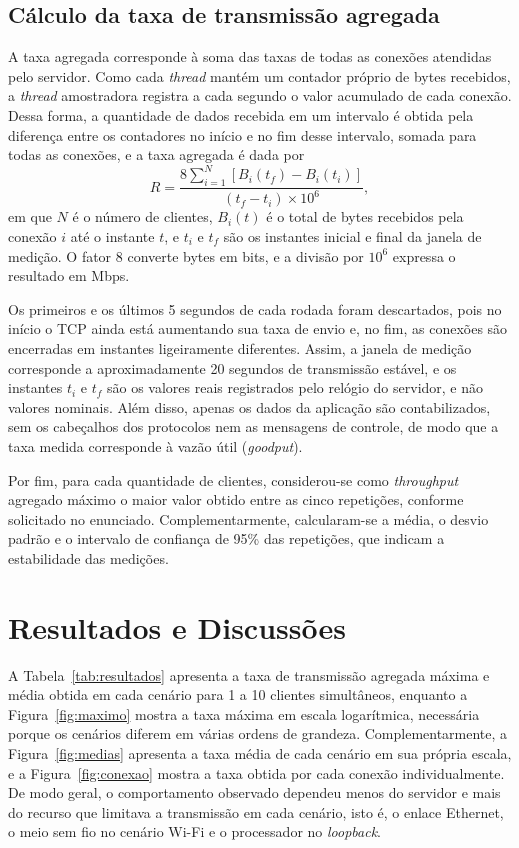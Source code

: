 \documentclass[12pt]{article}
\begin{document}
\subsection{Cálculo da taxa de transmissão agregada}

A taxa agregada corresponde à soma das taxas de todas as conexões atendidas
pelo servidor. Como cada \textit{thread} mantém um contador próprio de bytes
recebidos, a \textit{thread} amostradora registra a cada segundo o valor
acumulado de cada conexão. Dessa forma, a quantidade de dados recebida em um
intervalo é obtida pela diferença entre os contadores no início e no fim desse
intervalo, somada para todas as conexões, e a taxa agregada é dada por
\begin{equation}
R = \frac{8 \sum_{i=1}^{N} \left[ B_i(t_f) - B_i(t_i) \right]}{(t_f - t_i) \times 10^6},
\end{equation}
em que $N$ é o número de clientes, $B_i(t)$ é o total de bytes recebidos pela
conexão $i$ até o instante $t$, e $t_i$ e $t_f$ são os instantes inicial e
final da janela de medição. O fator 8 converte bytes em bits, e a divisão por
$10^6$ expressa o resultado em Mbps.

Os primeiros e os últimos 5 segundos de cada rodada foram descartados, pois no
início o TCP ainda está aumentando sua taxa de envio e, no fim, as conexões são
encerradas em instantes ligeiramente diferentes. Assim, a janela de medição
corresponde a aproximadamente 20 segundos de transmissão estável, e os
instantes $t_i$ e $t_f$ são os valores reais registrados pelo relógio do
servidor, e não valores nominais. Além disso, apenas os dados da aplicação são
contabilizados, sem os cabeçalhos dos protocolos nem as mensagens de controle,
de modo que a taxa medida corresponde à vazão útil (\textit{goodput}).

Por fim, para cada quantidade de clientes, considerou-se como
\textit{throughput} agregado máximo o maior valor obtido entre as cinco
repetições, conforme solicitado no enunciado. Complementarmente, calcularam-se
a média, o desvio padrão e o intervalo de confiança de 95\% das repetições, que
indicam a estabilidade das medições.

\section{Resultados e Discussões}\label{sec:resultados}

A Tabela~\ref{tab:resultados} apresenta a taxa de transmissão agregada máxima e
média obtida em cada cenário para 1 a 10 clientes simultâneos, enquanto a
Figura~\ref{fig:maximo} mostra a taxa máxima em escala logarítmica, necessária
porque os cenários diferem em várias ordens de grandeza. Complementarmente, a
Figura~\ref{fig:medias} apresenta a taxa média de cada cenário em sua própria
escala, e a Figura~\ref{fig:conexao} mostra a taxa obtida por cada conexão
individualmente. De modo geral, o comportamento observado dependeu menos do servidor e mais do recurso que
limitava a transmissão em cada cenário, isto é, o enlace Ethernet,
o meio sem fio no cenário Wi-Fi e o processador no \textit{loopback}.
\end{document}
